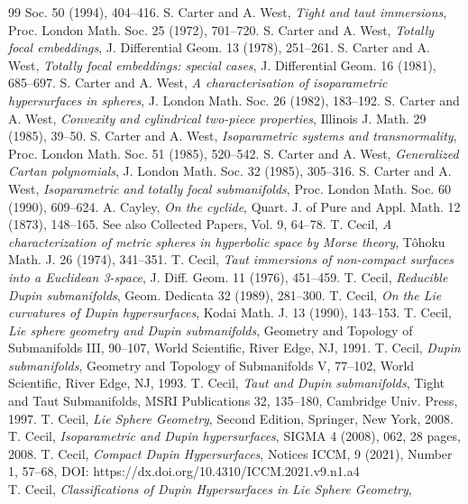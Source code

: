 \documentclass[12pt]{article}
\begin{document}
{\begin{thebibliography}{99}
Soc. 50 (1994), 404--416.
 S. Carter and A. West, {\em Tight and taut 
immersions}, Proc. London Math. Soc. 25 (1972), 701--720.
 S. Carter and A. West, {\em Totally
focal embeddings}, J. Differential Geom. 13 (1978), 251--261.
 S. Carter and A. West, {\em Totally
focal embeddings: special cases}, J. Differential Geom. 16 (1981), 685--697.
 S. Carter and A. West, {\em A characterisation
of isoparametric hypersurfaces in spheres}, J. London
Math. Soc. 26 (1982), 183--192.
 S. Carter and A. West, {\em Convexity and
cylindrical two-piece properties}, Illinois J. Math. 29 (1985), 39--50.
 S. Carter and A. West, {\em Isoparametric
systems and transnormality}, Proc. London Math. Soc.  51 (1985),
520--542.
 S. Carter and A. West, {\em Generalized 
Cartan polynomials}, J. London Math. Soc. 32 (1985), 305--316.
 S. Carter and A. West, {\em Isoparametric
and totally focal submanifolds}, Proc. London Math. Soc. 60
(1990), 609--624.
 A. Cayley, {\em On the cyclide}, Quart. J. of Pure and 
Appl. Math. 12 (1873), 148--165.  See also Collected Papers, Vol. 9,
64--78.  
T. Cecil, {\em A characterization of metric spheres
in hyperbolic space by Morse theory}, T\^{o}hoku Math. J. 26 (1974),
341--351.  
T. Cecil, {\em Taut immersions of non-compact
surfaces into a Euclidean 3-space}, J. Diff. Geom. 11 (1976), 451--459.
T. Cecil, {\em Reducible Dupin 
submanifolds},
Geom. Dedicata 32 (1989), 281--300.
T. Cecil, {\em On the 
Lie curvatures of Dupin
hypersurfaces}, Kodai Math. J. 13 (1990), 143--153.
T. Cecil, {\em Lie 
sphere geometry and Dupin 
submanifolds}, Geometry and Topology of Submanifolds III,
90--107, World Scientific, River Edge, NJ, 1991.
T. Cecil, {\em Dupin
submanifolds}, Geometry and Topology of Submanifolds V,
77--102, World Scientific, River Edge, NJ, 1993.
T. Cecil, 
{\em Taut and Dupin submanifolds}, Tight and Taut Submanifolds, 
MSRI Publications 32, 135--180, Cambridge Univ. Press, 1997.
 T. Cecil, {\em Lie Sphere Geometry}, Second Edition, Springer, New York, 2008. 
 T. Cecil, {\em Isoparametric and Dupin hypersurfaces}, SIGMA 4 (2008), 062, 28 pages, 2008.
 T. Cecil, {\em Compact Dupin Hypersurfaces}, Notices ICCM, 9 (2021), Number 1, 57--68, DOI: https://dx.doi.org/10.4310/ICCM.2021.v9.n1.a4 \\
 T. Cecil, {\em Classifications of Dupin Hypersurfaces in Lie Sphere Geometry},

\end{thebibliography}}
\end{document}
